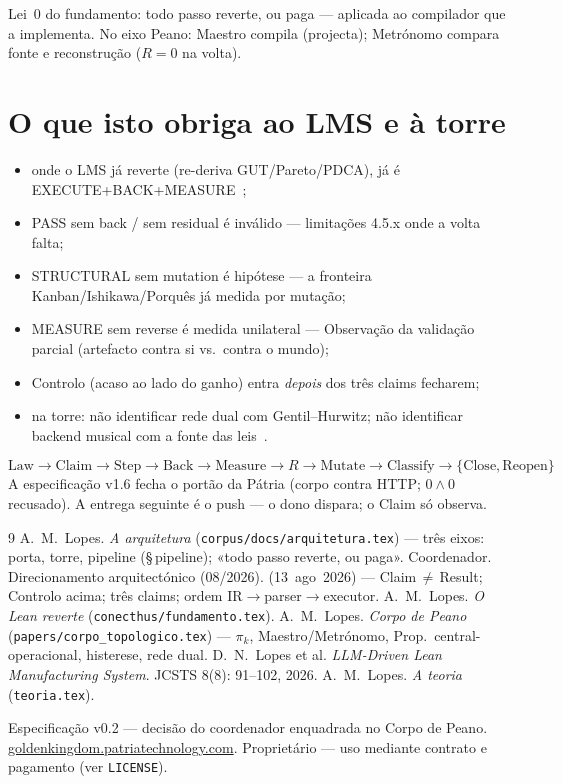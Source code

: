 \documentclass[11pt,a4paper]{article}
\newcommand{\code}[1]{\texttt{\small #1}}
\begin{document}
\noindent Lei~0 do fundamento: todo passo reverte, ou paga --- aplicada ao
compilador que a implementa. No eixo Peano: Maestro compila (projecta);
Metrónomo compara fonte e reconstrução ($R=0$ na volta).

\section{O que isto obriga ao LMS e à torre}\label{sec:obriga}

\begin{itemize}\itemsep3pt
\item onde o LMS já reverte (re-deriva GUT/Pareto/PDCA), já é
  EXECUTE+BACK+MEASURE~\cite{fundamento};
\item PASS sem back / sem residual é inválido --- limitações 4.5.x onde a
  volta falta;
\item STRUCTURAL sem mutation é hipótese --- a fronteira
  Kanban/Ishikawa/Porquês já medida por mutação;
\item MEASURE sem reverse é medida unilateral --- Observação da validação
  parcial (artefacto contra si vs.\ contra o mundo);
\item Controlo (acaso ao lado do ganho) entra \emph{depois} dos três claims
  fecharem;
\item na torre: não identificar rede dual com Gentil--Hurwitz; não
  identificar backend musical com a fonte das leis~\cite{peano}.
\end{itemize}

\[
\boxed{
\mathrm{Law}\to\mathrm{Claim}\to\mathrm{Step}\to\mathrm{Back}
\to\mathrm{Measure}\to R\to\mathrm{Mutate}\to\mathrm{Classify}
\to\{\mathrm{Close},\mathrm{Reopen}\}
}
\]
\noindent A especificação v1.6 fecha o portão da Pátria (corpo contra
HTTP; $0\wedge0$ recusado). A entrega seguinte é o push --- o dono
dispara; o Claim só observa.

\begin{thebibliography}{9}
 A.~M.~Lopes. \emph{A arquitetura}
  (\code{corpus/docs/arquitetura.tex}) --- três eixos: porta, torre, pipeline
  (\S\,pipeline); «todo passo reverte, ou paga».
 Coordenador. Direcionamento arquitectónico (08/2026).
  (13~ago~2026) --- Claim\,$\neq$\,Result; Controlo acima; três claims;
  ordem IR$\to$parser$\to$executor.
 A.~M.~Lopes. \emph{O Lean reverte}
  (\code{conecthus/fundamento.tex}).
 A.~M.~Lopes. \emph{Corpo de Peano}
  (\code{papers/corpo\_topologico.tex}) --- $\pi_k$, Maestro/Metrónomo,
  Prop.~central-operacional, histerese, rede dual.
 D.~N.~Lopes et al. \emph{LLM-Driven Lean Manufacturing System}.
  JCSTS 8(8): 91--102, 2026.
 A.~M.~Lopes. \emph{A teoria} (\code{teoria.tex}).
\end{thebibliography}

\vfill
{\footnotesize\color{cinza}\noindent
Especificação v0.2 --- decisão do coordenador enquadrada no Corpo de Peano.\\
\href{https://goldenkingdom.patriatechnology.com}{goldenkingdom.patriatechnology.com}.
Proprietário --- uso mediante contrato e pagamento (ver \texttt{LICENSE}).\par}
\end{document}
